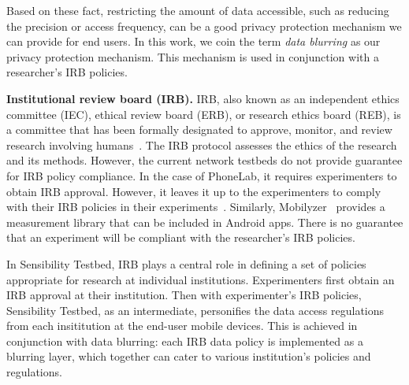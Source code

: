 Based on these fact, restricting 
the amount of data accessible, such as reducing the precision or 
access frequency, can be a good privacy protection mechanism we can 
provide for end users. In this work, we coin the term \textit{data blurring}
as our privacy protection mechanism. This mechanism is used in 
conjunction with a researcher's IRB policies. 

\textbf{Institutional review board (IRB).}
IRB, also known as an independent ethics committee (IEC), ethical 
review board (ERB), or research ethics board (REB), is a committee 
that has been formally designated to approve, monitor, and review 
research involving humans~\cite{irb}. The IRB protocol assesses 
the ethics of the research and its methods. However, the current network 
testbeds do not provide guarantee for IRB policy compliance.
In the case of PhoneLab, it requires experimenters to 
obtain IRB approval. However, it leaves it up to the experimenters 
to comply with their IRB policies in their 
experiments~\cite{nandugudi2013phonelab}. Similarly, 
Mobilyzer~\cite{nikravesh2015mobilyzer} provides a measurement
library that can be included in Android apps. 
There is no guarantee that an 
experiment will be compliant with the researcher's IRB policies.

In Sensibility Testbed, IRB plays a central role in defining a set of policies
appropriate for research at individual institutions. Experimenters
first obtain an IRB approval at their institution. Then with experimenter's IRB
policies, Sensibility Testbed, as an intermediate, personifies the data access regulations
from each insititution at the end-user mobile devices. This is achieved
in conjunction with data blurring: each IRB data policy is implemented
as a blurring layer, which together can cater to various institution's 
policies and regulations.